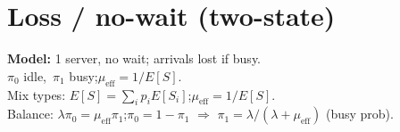 \section*{Loss / no-wait (two-state)}
\textbf{Model:} 1 server, no wait; arrivals lost if busy.\\
$\pi_0$ idle,\ $\pi_1$ busy;\quad $\mu_{\mathrm{eff}}=1/E[S]$.\\
Mix types: $E[S]=\sum_i p_i E[S_i]$;\quad $\mu_{\mathrm{eff}}=1/E[S]$.\\
Balance: $\lambda\pi_0=\mu_{\mathrm{eff}}\pi_1$;\quad $\pi_0=1-\pi_1$ $\Rightarrow$
$\pi_1=\lambda/(\lambda+\mu_{\mathrm{eff}})$ (busy prob).
